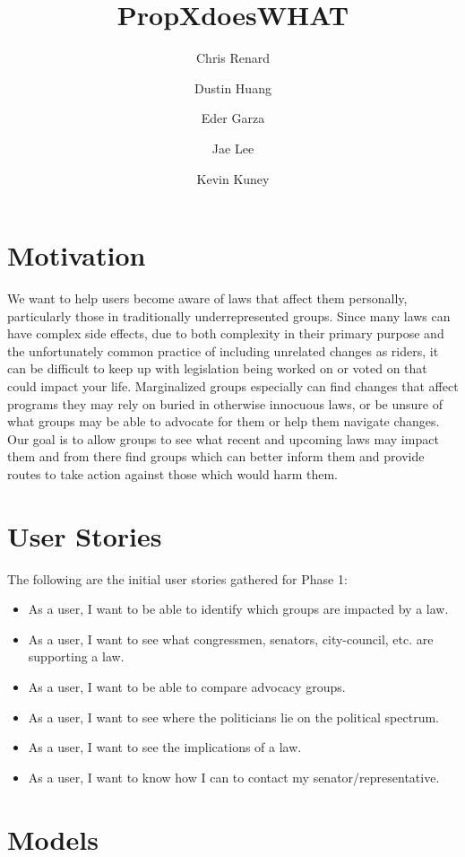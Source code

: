 \documentclass[12pt]{article}
\title{PropXdoesWHAT}
\author{Chris Renard \and Dustin Huang \and Eder Garza \and Jae Lee \and Kevin Kuney}
\date{} %
\begin{document}
\maketitle

\section{Motivation}

We want to help users become aware of laws that affect them personally, particularly those in traditionally underrepresented groups. 
Since many laws can have complex side effects, due to both complexity in their primary purpose and the unfortunately common practice of including unrelated changes as riders, it can be difficult to keep up with legislation being worked on or voted on that could impact your life.
Marginalized groups especially can find changes that affect programs they may rely on buried in otherwise innocuous laws, or be unsure of what groups may be able to advocate for them or help them navigate changes.
Our goal is to allow groups to see what recent and upcoming laws may impact them and from there find groups which can better inform them and provide routes to take action against those which would harm them.


\section{User Stories}

The following are the initial user stories gathered for Phase 1: \\

\begin{itemize}
	\item As a user, I want to be able to identify which groups are impacted by a law.
	\item As a user, I want to see what congressmen, senators, city-council, etc. are supporting a law.
	\item As a user, I want to be able to compare advocacy groups.
	\item As a user, I want to see where the politicians lie on the political spectrum.
	\item As a user, I want to see the implications of a law.
	\item As a user, I want to know how I can to contact my senator/representative.
\end{itemize}

\section{Models}
\end{document}
